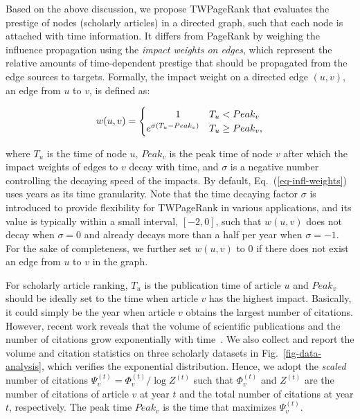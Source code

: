 Based on the above discussion, we propose TWPageRank that evaluates the prestige of nodes (\eg scholarly articles) in a directed graph, such that each node is attached with time information. It differs from PageRank by weighing the influence propagation using the {\em impact weights on edges}, which represent the relative amounts of time-dependent prestige that should be propagated from the edge sources to targets.
%
Formally, the impact weight on a directed edge $(u,v)$, \ie an edge from $u$ to $v$, is defined as:

\vspace{-1ex}
\begin{small}
\begin{equation} \label{eq-infl-weights}
w(u,v)  =  \begin{cases}  \hspace{7ex} 1 & T_u <  Peak_v \\
  e^{\sigma(T_u-Peak_v)} & T_u \geq Peak_v,
\end{cases}
\end{equation}
\end{small}
%
\noindent where $T_u$ is the time of node $u$, $Peak_v$ is the peak time of node $v$ after which the impact weights of edges to $v$ decay with time, and $\sigma$ is a negative number controlling the decaying speed of the impacts.
By default, Eq.~(\ref{eq-infl-weights}) uses years as its time granularity. Note that the time decaying factor $\sigma$ is introduced to provide flexibility for TWPageRank in various applications, and its value is typically within a small interval, \eg $[-2,0]$, such that $w(u,v)$ does not decay when $\sigma=0$ and already decays more than a half per year when $\sigma=-1$.
For the sake of completeness, we further set $w(u,v)$ to $0$ if there does not exist an edge from $u$ to $v$ in the graph.


For scholarly article ranking, $T_u$ is the publication time of article $u$ and $Peak_v$ should be ideally set to the time when article $v$ has the highest impact. Basically, it could simply be the year when article $v$ obtains the largest number of citations. However, recent work reveals that the volume of scientific publications and the number of citations grow exponentially with time~\cite{Dong2017KDD,BornmannM15}. We also collect and report the volume and citation statistics on three scholarly datasets in Fig.~\ref{fig-data-analysis}, which verifies the exponential distribution. Hence, we adopt the {\em scaled} number of citations $\Psi_v^{(t)}=\Phi_v^{(t)} / \log Z^{(t)}$ such that $\Phi_v^{(t)}$ and $Z^{(t)}$ are the number of citations of article $v$ at year $t$ and the total number of citations at year $t$, respectively. The peak time $Peak_v$ is the time that maximizes $\Psi_v^{(t)}$.



